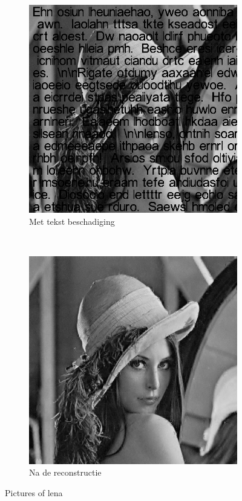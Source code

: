 \begin{figure}
    \centering
    \begin{subfigure}[b]{0.45\textwidth}
        \includegraphics[width=\textwidth]{../src/inpainting/lena_broke}
        \caption{Met tekst beschadiging}
        \label{fig:tiger}
    \end{subfigure}
    ~ %
    \begin{subfigure}[b]{0.45\textwidth}
        \includegraphics[width=\textwidth]{../src/inpainting/lena_fixed}
        \caption{Na de reconstructie}
        \label{fig:mouse}
    \end{subfigure}
    \caption{Pictures of lena}\label{fig:animals}
\end{figure}




